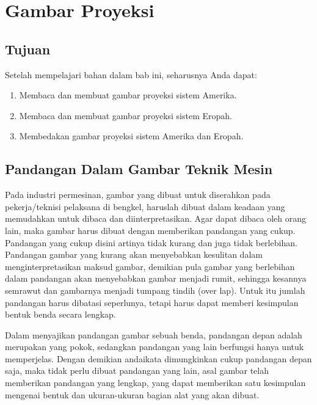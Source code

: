 \documentclass[../menggambar teknik.tex]{subfiles}
\begin{document}
\section{Gambar Proyeksi}%
\label{sec:Gambar Proyeksi}


\subsection{Tujuan}%
\label{sub:Tujuan}

Setelah mempelajari bahan dalam bab ini, seharusnya Anda dapat:

\begin{enumerate}
	\item Membaca dan membuat gambar proyeksi sistem Amerika.
	\item Membaca dan membuat gambar proyeksi sistem Eropah.
	\item Membedakan gambar proyeksi sistem Amerika dan Eropah.
\end{enumerate}

\subsection{Pandangan Dalam Gambar Teknik Mesin}
Pada industri permesinan, gambar yang dibuat untuk diserahkan pada pekerja/teknisi pelaksana di bengkel, haruslah dibuat dalam keadaan yang memudahkan untuk dibaca dan diinterpretasikan. Agar dapat dibaca oleh orang lain, maka gambar harus dibuat dengan memberikan pandangan yang cukup. Pandangan yang cukup disini artinya tidak kurang dan juga tidak berlebihan. Pandangan gambar yang kurang akan menyebabkan kesulitan dalam menginterpretasikan maksud gambar, demikian pula gambar yang berlebihan dalam pandangan akan menyebabkan gambar menjadi rumit, sehingga kesannya semrawut dan gambarnya menjadi tumpang tindih (over lap). Untuk itu jumlah pandangan harus dibatasi seperlunya, tetapi harus dapat memberi kesimpulan bentuk benda secara lengkap.

Dalam menyajikan pandangan gambar sebuah benda, pandangan depan adalah merupakan yang pokok, sedangkan pandangan yang lain berfungsi hanya untuk memperjelas. Dengan demikian andaikata dimungkinkan cukup pandangan depan saja, maka tidak perlu dibuat pandangan yang lain, asal gambar telah memberikan pandangan yang lengkap, yang dapat memberikan satu kesimpulan mengenai bentuk dan ukuran-ukuran bagian alat yang akan dibuat.
\end{document}
